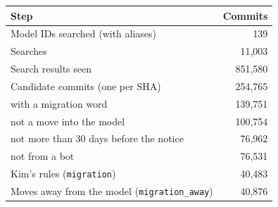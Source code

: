 \begin{tabular}{lr}
\toprule
Step & Commits \\
\midrule
Model IDs searched (with aliases) & 139 \\
Searches & 11,003 \\
Search results seen & 851,580 \\
Candidate commits (one per SHA) & 254,765 \\
with a migration word & 139,751 \\
not a move into the model & 100,754 \\
not more than 30 days before the notice & 76,962 \\
not from a bot & 76,531 \\
Kim's rules (\texttt{migration}) & 40,483 \\
Moves away from the model (\texttt{migration\_away}) & 40,876 \\
\bottomrule
\end{tabular}
